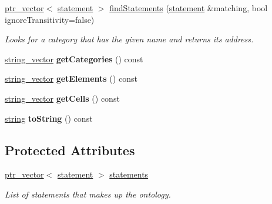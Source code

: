 \begin{DoxyCompactItemize}
\item 
\hypertarget{classmbdev__ontology_1_1ontology_acc8d92197dc8b96180c1f1e33cff6a67}{\hyperlink{classmbdev_1_1ptr__vector}{ptr\-\_\-vector}$<$ \hyperlink{classmbdev__ontology_1_1statement}{statement} $>$ \hyperlink{classmbdev__ontology_1_1ontology_acc8d92197dc8b96180c1f1e33cff6a67}{find\-Statements} (\hyperlink{classmbdev__ontology_1_1statement}{statement} \&matching, bool ignore\-Transitivity=false)}\label{classmbdev__ontology_1_1ontology_acc8d92197dc8b96180c1f1e33cff6a67}

\begin{DoxyCompactList}\small\item\em \-Looks for a category that has the given name and returns its address. \end{DoxyCompactList}\item 
\hypertarget{classmbdev__ontology_1_1ontology_adefeb11a57e891c9f0195dc3e57e46a0}{\hyperlink{classmbdev_1_1string__vector}{string\-\_\-vector} {\bfseries get\-Categories} () const }\label{classmbdev__ontology_1_1ontology_adefeb11a57e891c9f0195dc3e57e46a0}

\item 
\hypertarget{classmbdev__ontology_1_1ontology_a978a41f8f81f6fd330ae678b22d66ef4}{\hyperlink{classmbdev_1_1string__vector}{string\-\_\-vector} {\bfseries get\-Elements} () const }\label{classmbdev__ontology_1_1ontology_a978a41f8f81f6fd330ae678b22d66ef4}

\item 
\hypertarget{classmbdev__ontology_1_1ontology_a68fd8a8730f58589c8e39e6611d247e7}{\hyperlink{classmbdev_1_1string__vector}{string\-\_\-vector} {\bfseries get\-Cells} () const }\label{classmbdev__ontology_1_1ontology_a68fd8a8730f58589c8e39e6611d247e7}

\item 
\hypertarget{classmbdev__ontology_1_1ontology_ac7ac79e55a7b0914cad5f14156ab2cda}{\hyperlink{classmbdev_1_1string}{string} {\bfseries to\-String} () const }\label{classmbdev__ontology_1_1ontology_ac7ac79e55a7b0914cad5f14156ab2cda}

\end{DoxyCompactItemize}
\subsection*{\-Protected \-Attributes}
\begin{DoxyCompactItemize}
\item 
\hypertarget{classmbdev__ontology_1_1ontology_afe40885a5e07d5c03a85d1112be0af4b}{\hyperlink{classmbdev_1_1ptr__vector}{ptr\-\_\-vector}$<$ \hyperlink{classmbdev__ontology_1_1statement}{statement} $>$ \hyperlink{classmbdev__ontology_1_1ontology_afe40885a5e07d5c03a85d1112be0af4b}{statements}}\label{classmbdev__ontology_1_1ontology_afe40885a5e07d5c03a85d1112be0af4b}

\begin{DoxyCompactList}\small\item\em \-List of statements that makes up the ontology. \end{DoxyCompactList}\end{DoxyCompactItemize}
